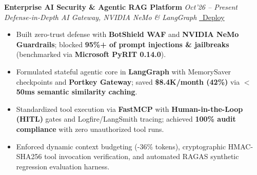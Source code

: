 \documentclass[10pt,a4paper]{article}
\begin{document}
\begin{minipage}[t]{0.488\textwidth}
    \vspace{0.8pt}\vspace{1.2pt}
    \noindent\textbf{Enterprise AI Security \& Agentic RAG Platform} \hfill {\footnotesize\textit{Oct'26 -- Present}}\\
    \textit{Defense-in-Depth AI Gateway, NVIDIA NeMo \& LangGraph} \href{https://github.com/KishorKumarParoi/AI_Security_Production_App}{\faGithub} \href{https://raw.githubusercontent.com/KishorKumarParoi/AI_Security_Production_App/main/bootstrap.sh}{\faRocket\ Deploy}
    \begin{itemize}
        \item Built zero-trust defense with \textbf{BotShield WAF} and \textbf{NVIDIA NeMo Guardrails}; blocked \textbf{95\%+ of prompt injections \& jailbreaks} (benchmarked via \textbf{Microsoft PyRIT 0.14.0}).
        \item Formulated stateful agentic core in \textbf{LangGraph} with MemorySaver checkpoints and \textbf{Portkey Gateway}; saved \textbf{\$8.4K/month (42\%)} via \textbf{$<$50ms semantic similarity caching}.
        \item Standardized tool execution via \textbf{FastMCP} with \textbf{Human-in-the-Loop (HITL)} gates and Logfire/LangSmith tracing; achieved \textbf{100\% audit compliance} with zero unauthorized tool runs.
        \item Enforced dynamic context budgeting (-36\% tokens), cryptographic HMAC-SHA256 tool invocation verification, and automated RAGAS synthetic regression evaluation harness.
    \end{itemize}


\end{minipage}
\end{document}
